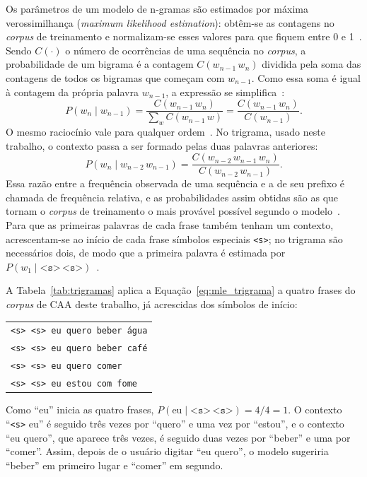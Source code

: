 Os parâmetros de um modelo de n-gramas são estimados por máxima verossimilhança (\textit{maximum likelihood estimation}): obtêm-se as contagens no \textit{corpus} de treinamento e normalizam-se esses valores para que fiquem entre 0 e 1~\cite[cap.~3]{jurafsky2026slp}. Sendo $C(\cdot)$ o número de ocorrências de uma sequência no \textit{corpus}, a probabilidade de um bigrama é a contagem $C(w_{n-1}\,w_n)$ dividida pela soma das contagens de todos os bigramas que começam com $w_{n-1}$. Como essa soma é igual à contagem da própria palavra $w_{n-1}$, a expressão se simplifica~\cite[cap.~3]{jurafsky2026slp}:
\begin{equation}
    P(w_n \mid w_{n-1}) = \frac{C(w_{n-1}\,w_n)}{\sum_{w} C(w_{n-1}\,w)} = \frac{C(w_{n-1}\,w_n)}{C(w_{n-1})}.
    \label{eq:mle}
\end{equation}
O mesmo raciocínio vale para qualquer ordem~\cite[cap.~3]{jurafsky2026slp}. No trigrama, usado neste trabalho, o contexto passa a ser formado pelas duas palavras anteriores:
\begin{equation}
    P(w_n \mid w_{n-2}\,w_{n-1}) = \frac{C(w_{n-2}\,w_{n-1}\,w_n)}{C(w_{n-2}\,w_{n-1})}.
    \label{eq:mle_trigrama}
\end{equation}
Essa razão entre a frequência observada de uma sequência e a de seu prefixo é chamada de frequência relativa, e as probabilidades assim obtidas são as que tornam o \textit{corpus} de treinamento o mais provável possível segundo o modelo~\cite[cap.~3]{jurafsky2026slp}. Para que as primeiras palavras de cada frase também tenham um contexto, acrescentam-se ao início de cada frase símbolos especiais \texttt{<s>}; no trigrama são necessários dois, de modo que a primeira palavra é estimada por $P(w_1 \mid \texttt{<s>}\,\texttt{<s>})$~\cite[cap.~3]{jurafsky2026slp}.

A Tabela~\ref{tab:trigramas} aplica a Equação~\ref{eq:mle_trigrama} a quatro frases do \textit{corpus} de \gls{CAA} deste trabalho, já acrescidas dos símbolos de início:
\begin{center}
    \begin{tabular}{l}
        \texttt{<s> <s> eu quero beber água}\\
        \texttt{<s> <s> eu quero beber café}\\
        \texttt{<s> <s> eu quero comer}\\
        \texttt{<s> <s> eu estou com fome}
    \end{tabular}
\end{center}
Como ``eu'' inicia as quatro frases, $P(\textrm{eu} \mid \texttt{<s>}\,\texttt{<s>}) = 4/4 = 1$. O contexto ``\texttt{<s>} eu'' é seguido três vezes por ``quero'' e uma vez por ``estou'', e o contexto ``eu quero'', que aparece três vezes, é seguido duas vezes por ``beber'' e uma por ``comer''. Assim, depois de o usuário digitar ``eu quero'', o modelo sugeriria ``beber'' em primeiro lugar e ``comer'' em segundo.

